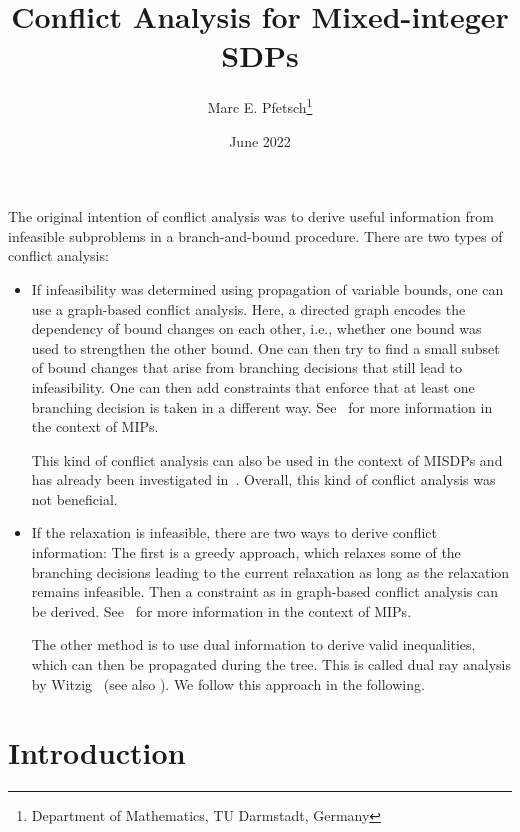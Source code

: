\documentclass[10pt, a4paper]{article}
\title{Conflict Analysis for Mixed-integer SDPs}
\author{Marc E. Pfetsch\thanks{Department of Mathematics, TU Darmstadt, Germany}}
\date{June 2022}
\begin{document}
\maketitle

The original intention of conflict analysis was to derive useful
information from infeasible subproblems in a branch-and-bound
procedure. There are two types of conflict analysis: 
\begin{itemize}
\item If infeasibility was determined using propagation of variable bounds,
  one can use a graph-based conflict analysis. Here, a directed graph
  encodes the dependency of bound changes on each other, i.e., whether one
  bound was used to strengthen the other bound. One can then try to find a
  small subset of bound changes that arise from branching decisions that
  still lead to infeasibility. One can then add constraints that enforce
  that at least one branching decision is taken in a different
  way. See~\cite{Ach07b,Ach07} for more information in the context of MIPs.

  This kind of conflict analysis can also be used in the context of MISDPs
  and has already been investigated in~\cite{MatP22}. Overall, this kind of
  conflict analysis was not beneficial.
\item If the relaxation is infeasible, there are two ways to derive
  conflict information: The first is a greedy approach, which relaxes some
  of the branching decisions leading to the current relaxation as long as
  the relaxation remains infeasible. Then a constraint as in graph-based
  conflict analysis can be derived. See~\cite{Ach07b,Ach07} for more
  information in the context of MIPs.

  The other method is to use dual information to derive valid inequalities,
  which can then be propagated during the tree. This is called dual ray
  analysis by Witzig~\cite{Wit22} (see also \cite{WitBH17}). We follow this
  approach in the following.
\end{itemize}



\section{Introduction}
\end{document}

